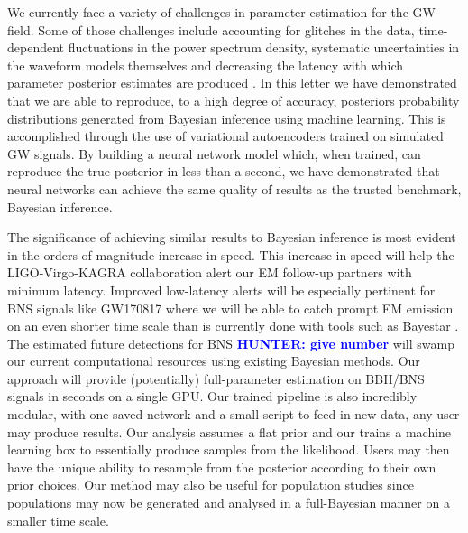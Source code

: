 \documentclass[%
showpacs,
 amsmath,amssymb,
 aps,
 twocolumn,
 prl,
 reprint,
floatfix,
]{revtex4-1}
\newcommand{\hunter}[1]{\textbf{\textcolor{blue}{HUNTER: #1}}}
\begin{document}
%
%
%
We currently face a variety of challenges in 
parameter estimation for the \ac{GW} field. Some of those 
challenges include accounting for glitches in the data, time-dependent 
fluctuations in the power spectrum density, systematic uncertainties 
in the waveform models themselves and decreasing the latency with 
which parameter posterior estimates are produced \cite{1409.7215}. 
In this letter we have demonstrated that we are able to
reproduce, to a high degree of accuracy, posteriors probability distributions generated from Bayesian
inference using machine learning. This is accomplished through the use of
variational autoencoders trained on simulated \ac{GW} signals. By building a neural network model which,
when trained, can reproduce the true posterior in less than a second,
we have demonstrated that neural networks can achieve the same 
quality of results as the trusted
benchmark, Bayesian inference.

%
%
The significance of achieving similar results
to Bayesian inference is most evident in the orders of magnitude increase in speed. This increase in speed will help the
LIGO-Virgo-KAGRA collaboration alert our \ac{EM} follow-up partners with
minimum latency. Improved low-latency alerts will be especially 
pertinent for \ac{BNS} signals like GW170817 where we will be able 
to catch prompt \ac{EM} emission on an even shorter time scale than 
is currently done with tools such as Bayestar \cite{1508.03634}. 
The estimated future detections for \ac{BNS} \hunter{ 
give number} will swamp our current computational resources using 
existing Bayesian methods. Our approach will provide (potentially) 
full-parameter estimation on \ac{BBH}/{\ac{BNS}} signals in seconds 
on a single GPU. Our trained pipeline is also incredibly modular, with 
one saved network and a small script to feed in new data, 
any user may produce results. Our analysis assumes a flat prior and our 
trains a machine learning box to essentially produce samples 
from the likelihood. Users may then have the unique ability to 
resample from the posterior according to their own prior choices. Our 
method may also be useful for population studies since populations 
may now be generated and analysed in a full-Bayesian manner on a smaller 
time scale. 
\end{document}
